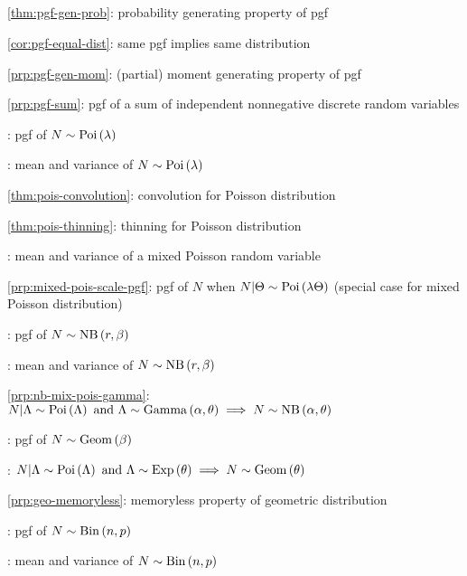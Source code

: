 \subsection*{}
\item \cref{thm:pgf-gen-prob}: probability generating property of pgf
\item \cref{cor:pgf-equal-dist}: same pgf implies same distribution
\item \cref{prp:pgf-gen-mom}: (partial) moment generating property of pgf
\item \cref{prp:pgf-sum}: pgf of a sum of independent nonnegative discrete random variables
\item {}: pgf of \(N\sim\operatorname{Poi}\left(\lambda\right)\)
\item {}: mean and variance of \(N\sim\operatorname{Poi}\left(\lambda\right)\)
\item \cref{thm:pois-convolution}: convolution for Poisson distribution
\item \cref{thm:pois-thinning}: thinning for Poisson distribution
\item {}: mean and variance of a mixed Poisson random variable
\item \cref{prp:mixed-pois-scale-pgf}: pgf of \(N\) when \(N|\Theta\sim\operatorname{Poi}\left(\lambda\Theta\right)\) (special case for mixed Poisson distribution)
\item {}: pgf of \(N\sim\operatorname{NB}\left(r,\beta\right)\)
\item {}: mean and variance of \(N\sim\operatorname{NB}\left(r,\beta\right)\)
\item \cref{prp:nb-mix-pois-gamma}: \(N|\Lambda\sim\operatorname{Poi}\left(\Lambda\right)\text{ and }\Lambda\sim\operatorname{Gamma}\left(\alpha,\theta\right)\implies N\sim\operatorname{NB}\left(\alpha,\theta\right)\)
\item {}: pgf of \(N\sim\operatorname{Geom}\left(\beta\right)\)
\item {}: \(N|\Lambda\sim\operatorname{Poi}\left(\Lambda\right)\text{ and }\Lambda\sim\operatorname{Exp}\left(\theta\right)\implies N\sim\operatorname{Geom}\left(\theta\right)\)
\item \cref{prp:geo-memoryless}: memoryless property of geometric distribution
\item {}: pgf of \(N\sim\operatorname{Bin}\left(n,p\right)\)
\item {}: mean and variance of \(N\sim\operatorname{Bin}\left(n,p\right)\)

